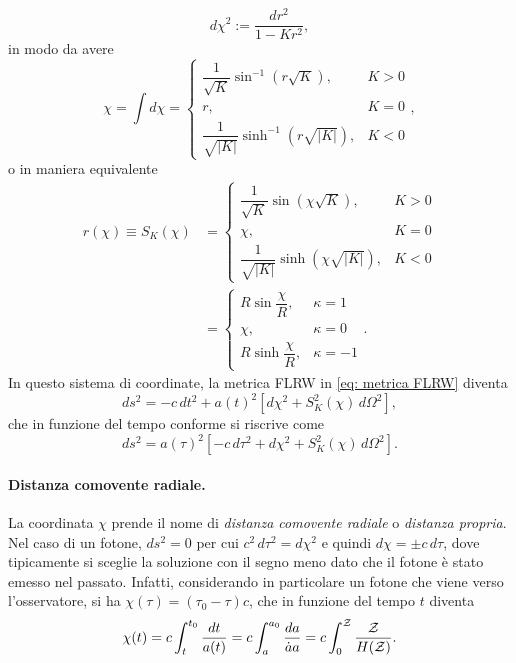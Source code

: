 \begin{equation}
    d\chi^2 := \frac{dr^2}{1 - Kr^2},
\end{equation}
in modo da avere 
\begin{equation}
    \chi = \int d\chi = 
    \begin{cases}
        \dfrac{1}{\sqrt{K}}\sin^{-1}{(r\sqrt{K})}, &K > 0 \\[2ex]
        r, &K = 0 \\[2ex]
        \dfrac{1}{\sqrt{|K|}}\sinh^{-1}{(r\sqrt{|K|})}, &K < 0
    \end{cases},
\end{equation}
o in maniera equivalente 
\begin{equation}
    \begin{split}
        r(\chi) \equiv S_K(\chi) &= 
        \begin{cases}
            \dfrac{1}{\sqrt{K}}\sin{(\chi\sqrt{K})}, &K > 0 \\[2ex]
            \chi, &K = 0 \\[2ex]
            \dfrac{1}{\sqrt{|K|}}\sinh{(\chi\sqrt{|K|})}, &K < 0
        \end{cases} \\
        &= 
        \begin{cases}
            R\sin{\dfrac{\chi}{R}}, &\kappa = 1 \\[2ex]
            \chi, &\kappa = 0 \\[2ex]
            R\sinh{\dfrac{\chi}{R}}, &\kappa = -1
        \end{cases}.
    \end{split}
\end{equation}
In questo sistema di coordinate, la metrica FLRW in \eqref{eq: metrica FLRW} diventa
\begin{equation}
    ds^2 = -c\,dt^2 + a(t)^2[d\chi^2 + S_K^2(\chi)\,d\Omega^2],
\end{equation}
che in funzione del tempo conforme si riscrive come 
\begin{equation}
    ds^2  = a(\tau)^2[-c\,d\tau^2 + d\chi^2 + S_K^2(\chi)\,d\Omega^2].
\end{equation}

\paragraph{Distanza comovente radiale.} La coordinata $\chi$ prende il nome di \emph{distanza comovente radiale} o \emph{distanza propria}. Nel caso di un fotone, $ds^2 = 0$ per cui $c^2\,d\tau^2 = d\chi^2$ e quindi $d\chi = \pm c\,d\tau$, dove tipicamente si sceglie la soluzione con il segno meno dato che il fotone è stato emesso nel passato. Infatti, considerando in particolare un fotone che viene verso l'osservatore, si ha $\chi(\tau) = (\tau_0 - \tau)c$, che in funzione del tempo $t$ diventa
\begin{equation}
    \chi(t) = c\int_{t}^{t_0}\frac{dt}{a(t)} = c\int_{a}^{a_0}\frac{da}{\dot{a}a} = c\int_0^{\mathcal{Z}}\frac{\mathcal{Z}}{H(\mathcal{Z})}.
\end{equation}
